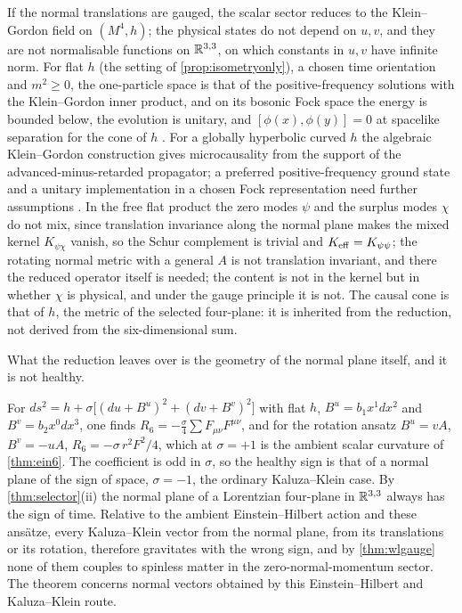 \begin{corollary}
\label{cor:weak}
If the normal translations are gauged, the scalar sector reduces to the Klein--Gordon field on $(M^4,h)$; the physical states do not depend on
$u,v$, and they are not normalisable functions on $\mathbb{R}^{3,3}$, on which constants in $u,v$ have infinite norm. For flat $h$ (the setting of
\cref{prop:isometryonly}), a chosen time orientation and $m^2\ge0$, the one-particle space is that of the positive-frequency solutions with the
Klein--Gordon inner product, and on its bosonic Fock space the energy is bounded below, the evolution is unitary, and $[\phi(x),\phi(y)]=0$ at
spacelike separation for the cone of $h$ \cite{WeinbergQFT}. For a globally hyperbolic curved $h$ the algebraic Klein--Gordon construction gives
microcausality from the support of the advanced-minus-retarded propagator; a preferred positive-frequency ground state and a unitary
implementation in a chosen Fock representation need further assumptions \cite{FewsterVerch12}. In the free flat product the zero modes $\psi$ and the surplus modes $\chi$ do not
mix, since translation invariance along the normal plane makes the mixed kernel $K_{\psi\chi}$ vanish, so the Schur complement is trivial and $K_{\rm eff}=K_{\psi\psi}$;
the rotating normal metric with a general $A$ is not translation invariant, and there the reduced operator itself is needed; the content is not in
the kernel but in whether $\chi$ is physical, and under the gauge principle it is not. The causal cone is that of $h$, the metric of the selected four-plane: it is inherited
from the reduction, not derived from the six-dimensional sum.
\end{corollary}

What the reduction leaves over is the geometry of the normal plane itself, and it is not healthy.

\begin{theorem}
\label{thm:ghostvec}
For $ds^2=h+\sigma\bigl[(du+B^u)^2+(dv+B^v)^2\bigr]$ with flat $h$, $B^u=b_1x^1dx^2$ and $B^v=b_2x^0dx^3$, one finds $R_6=-\tfrac\sigma4\sum F_{\mu\nu}F^{\mu\nu}$, and for the
rotation ansatz $B^u=vA$, $B^v=-uA$, $R_6=-\sigma\,r^2F^2/4$, which at $\sigma=+1$ is the ambient scalar curvature of \cref{thm:ein6}. The coefficient is odd in $\sigma$, so the
healthy sign is that of a normal plane of the sign of space, $\sigma=-1$, the ordinary Kaluza--Klein case. By \cref{thm:selector}(ii) the normal plane of a Lorentzian
four-plane in $\mathbb{R}^{3,3}$ always has the sign of time. Relative to the ambient Einstein--Hilbert action and these ans\"atze, every Kaluza--Klein vector from the normal plane, from its
translations or its rotation, therefore gravitates with the wrong sign, and by \cref{thm:wlgauge} none of them couples to spinless matter in the
zero-normal-momentum sector. The theorem concerns normal vectors obtained by this Einstein--Hilbert and Kaluza--Klein route.
\end{theorem}

